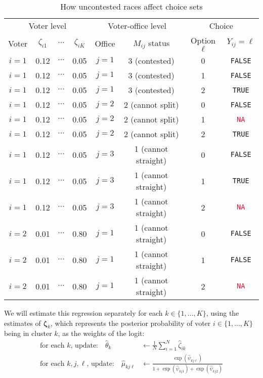 \documentclass[11pt]{article}
\begin{document}
\begin{table}[!h]
\caption{How uncontested races affect choice sets \label{tab:choiceset}}
\centering
\singlespacing
\small
\begin{tabular}{cccccccc}
\toprule
\multicolumn{4}{c}{Voter level} & \multicolumn{2}{c}{Voter-office level} & \multicolumn{2}{c}{Choice}\\
\cmidrule(lr){1-4} \cmidrule(lr){5-6}\cmidrule(lr){7-8}
Voter     & \(\zeta_{i1}\) & \(\cdots\) & \(\zeta_{iK}\) &   Office & \(M_{ij}\) status & Option $\ell$ &  \(Y_{ij} = \ell\)\\\midrule
\(i = 1\) & 0.12 & \(\cdots\) & 0.05 &  \(j = 1\) & 3 (contested) & 0 & \texttt{FALSE}\\
\(i = 1\) & 0.12 & \(\cdots\) & 0.05 &  \(j = 1\) & 3 (contested) & 1 & \texttt{FALSE}\\
\(i = 1\) & 0.12 & \(\cdots\) & 0.05 &  \(j = 1\) & 3 (contested) & 2 & \texttt{TRUE}\\\addlinespace
\(i = 1\) & 0.12 & \(\cdots\) & 0.05 &  \(j = 2\) & 2 (cannot split) & 0 & \texttt{FALSE}\\
\(i = 1\) & 0.12 & \(\cdots\) & 0.05 &  \(j = 2\) & 2 (cannot split) & 1 & \textcolor{crimson}{\texttt{NA}}\\
\(i = 1\) & 0.12 & \(\cdots\) & 0.05 &  \(j = 2\) & 2 (cannot split) & 2 & \texttt{TRUE}\\\addlinespace
\(i = 1\) & 0.12 & \(\cdots\) & 0.05 &  \(j = 3\) & 1 (cannot straight) & 0 & \texttt{FALSE}\\
\(i = 1\) & 0.12 & \(\cdots\) & 0.05 &  \(j = 3\) & 1 (cannot straight) & 1 & \texttt{TRUE}\\
\(i = 1\) & 0.12 & \(\cdots\) & 0.05 &  \(j = 3\) & 1 (cannot straight) & 2 & \textcolor{crimson}{\texttt{NA}}\\\addlinespace
\(i = 2\) & 0.01 & \(\cdots\) & 0.80 &  \(j = 1\) & 1 (cannot straight) & 0 & \texttt{FALSE}\\
\(i = 2\) & 0.01 & \(\cdots\) & 0.80 &  \(j = 1\) & 1 (cannot straight) & 1 & \texttt{FALSE}\\
\(i = 2\) & 0.01 & \(\cdots\) & 0.80 &  \(j = 1\) & 1 (cannot straight) & 2 & \textcolor{crimson}{\texttt{NA}}\\
\bottomrule
\end{tabular}
\end{table}

We will estimate this regression separately for each \(k \in \{1, ..., K\}\), using the estimates of \(\bm{\zeta}_{k}\), which represents the posterior probability of voter \(i \in \{1, ..., K\}\) being in cluster \(k\), as the weights of the logit:
\begin{align}
\text{for each \(k\), update: }~~~  \widehat{\theta}_{k} &\leftarrow \frac{1}{N}\sum^N_{i = 1}\widehat{\zeta}_{ik} \\
\text{for each \(k, j, \ell\), update: }~~~ \widehat{\mu}_{kj\ell} &\leftarrow  \frac{\exp\left(\widehat\psi_{kj\ell}\right)}{1 + \exp\left(\widehat\psi_{kj1}\right) + \exp\left(\widehat\psi_{kj2}\right)}
\end{align}
\end{document}
